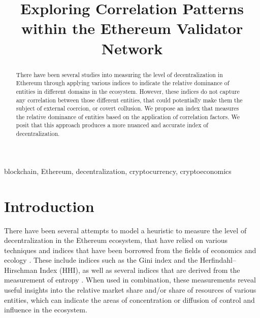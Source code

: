 \documentclass[conference]{IEEEtran}
\begin{document}
\title{Exploring Correlation Patterns within the Ethereum Validator Network}

\author{
  \and
}

\maketitle

\begin{abstract}
There have been several studies into measuring the level of decentralization in Ethereum through applying various indices to indicate the relative dominance of entities in different domains in the ecosystem.  However, these indices do not capture any correlation between those different entities, that could potentially make them the subject of external coercion, or covert collusion.  We propose an  index that measures the relative dominance of entities based on the application of correlation factors.  We posit that this approach produces a more nuanced and accurate index of decentralization.
\end{abstract}

\begin{IEEEkeywords}
blockchain, Ethereum, decentralization, cryptocurrency, cryptoeconomics
\end{IEEEkeywords}

\section{Introduction}

There have been several attempts to model a heuristic to measure the level of decentralization in the Ethereum ecosystem, that have relied on various techniques and indices that have been borrowed from the fields of economics and ecology \cite{wu2020coefficient} \cite{gupta2018gini} \cite{gochhayat2020measuring} \cite{lee2021dq}.  These include indices such as the Gini index and the Herfindahl–Hirschman Index (HHI), as well as several indices that are derived from the measurement of entropy \cite{brown2023measuring}.  When used in combination, these measurements reveal useful insights into the relative market share and/or share of resources of various entities, which can indicate the areas of concentration or diffusion of control and influence in the ecosystem.
\end{document}
